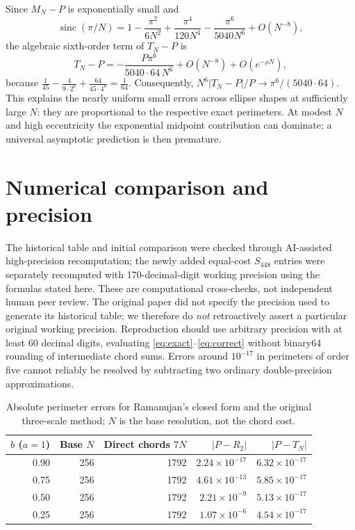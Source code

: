 \documentclass[11pt]{article}
\begin{document}
Since $M_N-P$ is exponentially small and
\[
\operatorname{sinc}(\pi/N)=1-\frac{\pi^2}{6N^2}+\frac{\pi^4}{120N^4}-\frac{\pi^6}{5040N^6}+O(N^{-8}),
\]
the algebraic sixth-order term of $T_N-P$ is
\begin{equation}\label{eq:six}
T_N-P=-\frac{P\pi^6}{5040\cdot64\,N^6}+O(N^{-8})+O(e^{-\rho N}),
\end{equation}
because $\tfrac1{45}-\tfrac4{9\cdot2^6}+\tfrac{64}{45\cdot4^6}=\tfrac1{64}$. Consequently, $N^6|T_N-P|/P\to\pi^6/(5040\cdot64)$. This explains the nearly uniform small errors across ellipse shapes at sufficiently large $N$: they are proportional to the respective exact perimeters. At modest $N$ and high eccentricity the exponential midpoint contribution can dominate; a universal asymptotic prediction is then premature.
\section{Numerical comparison and precision}
The historical table and initial comparison were checked through AI-assisted high-precision recomputation; the newly added equal-cost $S_{448}$ entries were separately recomputed with 170-decimal-digit working precision using the formulas stated here. These are computational cross-checks, not independent human peer review. The original paper did not specify the precision used to generate its historical table; we therefore do \emph{not} retroactively assert a particular original working precision. Reproduction should use arbitrary precision with at least 60 decimal digits, evaluating \eqref{eq:exact}--\eqref{eq:correct} without binary64 rounding of intermediate chord sums. Errors around $10^{-17}$ in perimeters of order five cannot reliably be resolved by subtracting two ordinary double-precision approximations.
\begin{table}[ht]
\centering\small
\begin{tabular}{@{}rrrrr@{}}\toprule
$b$ ($a=1$) & Base $N$ & Direct chords $7N$ & $|P-R_2|$ & $|P-T_N|$\\\midrule
0.90&256&1792&$2.24\times10^{-17}$&$6.32\times10^{-17}$\\
0.75&256&1792&$4.61\times10^{-13}$&$5.85\times10^{-17}$\\
0.50&256&1792&$2.21\times10^{-9}$&$5.13\times10^{-17}$\\
0.25&256&1792&$1.07\times10^{-6}$&$4.54\times10^{-17}$\\\bottomrule
\end{tabular}
\caption{Absolute perimeter errors for Ramanujan's closed form and the original three-scale method; $N$ is the base resolution, not the chord cost.}\label{tab:old}
\end{table}
\end{document}
